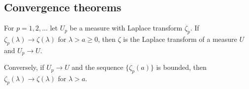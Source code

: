 \subsection{Convergence theorems}
\begin{thm}\label{thm: ext cont thm}
	For \(p=1,2,\dots\) let \(U_p\) be a measure with Laplace transform \(\zeta_p\). If \(\zeta_p(\lambda)\to\zeta(\lambda)\) for \(\lambda > a\geq 0\), then \(\zeta\) is the Laplace transform of a measure \(U\) and \(U_p\to U\).
	
	Conversely, if \(U_p\to U\) and the sequence \(\{\zeta_p(a)\}\) is bounded, then \(\zeta_p(\lambda)\to\zeta(\lambda)\) for \(\lambda >a\). 
\end{thm}